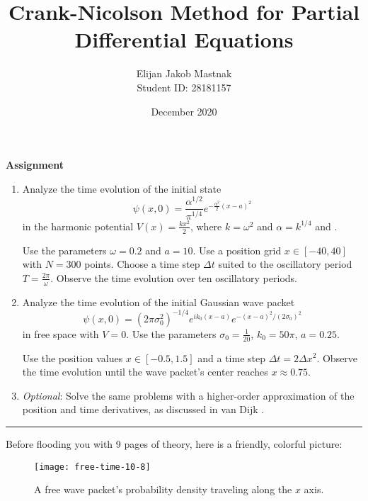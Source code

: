\documentclass[11pt, a4paper]{article}
\begin{document}
\title{Crank-Nicolson Method for Partial Differential Equations}
\author{Elijan Jakob Mastnak\\[1mm]\small{Student ID: 28181157}}
\date{December 2020}
\maketitle

\tableofcontents

\newpage
\begin{center}
\textbf{Assignment}
\begin{enumerate}
	\item Analyze the time evolution of the initial state
	\begin{equation*}
		\psi(x, 0) = \frac{\alpha^{1/2}}{\pi^{1/4}}e^{-\frac{\alpha^{2}}{2}(x - a)^{2}}
	\end{equation*}
	in the harmonic potential $ V(x) = \frac{kx^{2}}{2} $, where $ k = \omega^{2} $ and $ \alpha = k^{1/4} $ and .
	
	Use the parameters $ \omega = 0.2 $ and $ a = 10 $. Use a position grid $ x \in [-40, 40] $ with $ N = 300 $ points. Choose a time step $ \Delta t $ suited to the oscillatory period $ T = \frac{2\pi}{\omega} $. Observe the time evolution over ten oscillatory periods.
	
	\item Analyze the time evolution of the initial Gaussian wave packet
	\begin{equation*}
		\psi(x, 0) = (2\pi \sigma_{0}^{2})^{-1/4}e^{ik_{0}(x - a)}e^{-(x - a)^{2}/(2\sigma_{0})^{2}}
	\end{equation*}
	in free space with $ V = 0 $. Use the parameters $ \sigma_{0} = \frac{1}{20} $, $ k_{0} = 50 \pi $, $ a = 0.25 $. 
	
	Use the position values $ x \in  [-0.5, 1.5] $ and a time step $ \Delta t = 2 \Delta x^{2} $. Observe the time evolution until the wave packet's center reaches $ x \approx 0.75 $. 
	
	
	\item \textit{Optional}: Solve the same problems with a higher-order approximation of the position and time derivatives, as discussed in van Dijk \cite{vandijk}.
\end{enumerate}
\end{center}

\rule{\textwidth}{0.2pt} 
\vspace{3mm}

Before flooding you with 9 pages of theory, here is a friendly, colorful picture:
\begin{figure}[htb!]
\centering
\texttt{[image: free-time-10-8]}
\caption{A free wave packet's probability density traveling along the $ x $ axis.}
\label{diff:fig:intro}
\end{figure}
\end{document}
